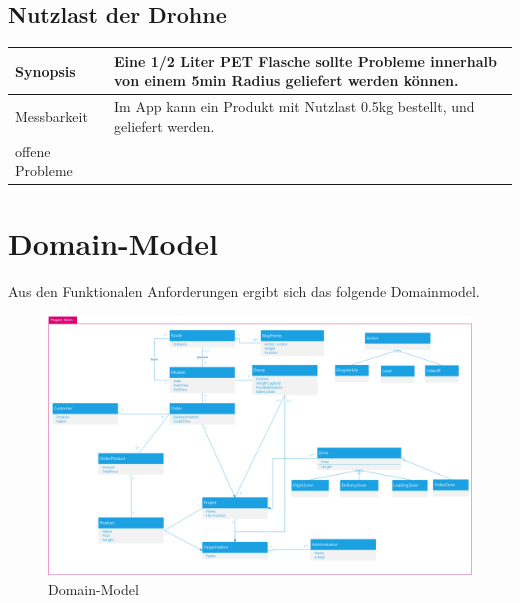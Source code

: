 \subsection{Nutzlast der Drohne}
\begin{tabular}{|p{}|p{}|} \hline
	Synopsis & Eine 1/2 Liter PET Flasche sollte Probleme innerhalb von einem 5min Radius geliefert werden können. \\ \hline
	Messbarkeit & Im App kann ein Produkt mit Nutzlast 0.5kg bestellt, und geliefert werden. \\ \hline
	offene Probleme &   \\ \hline
\end{tabular}


\section{Domain-Model}

Aus den Funktionalen Anforderungen ergibt sich das folgende Domainmodel.

\begin{figure}[h]
	\includegraphics[width=1.0\textwidth]{images/domainmodell.png}
	\caption{Domain-Model}
	\label{fig:domain-model}
\end{figure}

